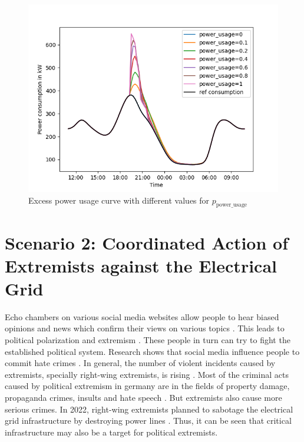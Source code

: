 \begin{figure}[!ht]
    \centering
    \includegraphics[scale=.6]{figs/eval/scenario1/powerusage.png}
    \caption{Excess power usage curve with different values for 
    $p_{\mathrm{power\_usage}}$}
    \label{scen1variablepowerusage} 
\end{figure}

\section{Scenario 2: Coordinated Action of Extremists 
against the Electrical Grid}
\label{scenario2total}
Echo chambers on various social media websites allow people to 
hear biased opinions and news which confirm their views on 
various topics \cite{terren2021echo}. This leads to political
polarization and extremism \cite{van2022banality}.
These people in turn can try to fight the established political
system. Research shows that social media influence people
to commit hate crimes \cite{muller2021fanning}.
In general, the number of violent incidents caused by
extremists, specially right-wing extremists, is rising 
\cite{koehler2016right}. 
Most of the criminal acts caused by political extremism 
in germany are in the fields of property damage, 
propaganda crimes, insults and hate speech \cite{bmicrimestatistics}.
But extremists also cause more serious crimes. In 2022,
right-wing extremists planned to sabotage the electrical grid 
infrastructure by destroying power lines \cite{anschlagstrom}.
Thus, it can be seen that critical infrastructure may also be a target
for political extremists. 

